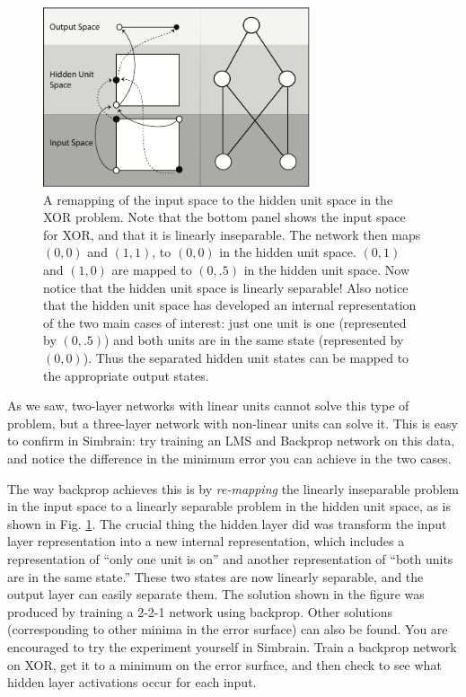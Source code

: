 \begin{figure}[h]
\centering
\includegraphics[width=0.7\textwidth]{images/xor_internal_rep.png}
\caption[Pamela Payne.]{A remapping of the input space to the hidden unit space in the XOR problem. Note that the bottom panel shows the input space for XOR, and that it is linearly inseparable. The network then maps $(0,0)$ and $(1,1)$,  to $(0,0)$ in the hidden unit space. $(0,1)$ and $(1,0)$ are mapped to $(0,.5)$ in the hidden unit space. Now notice that the hidden unit space is linearly separable!  Also notice that the hidden unit space has developed an internal representation of the two main cases of interest: just one unit is one (represented by $(0,.5)$) and both units are in the same state (represented by $(0,0)$). Thus the separated hidden unit states can be mapped to the appropriate output states.}
\label{xor_remapping}
\end{figure}

As we saw, two-layer networks with linear units cannot solve this type of problem, but a three-layer network with non-linear units can solve it. This is easy to confirm in Simbrain: try training an LMS and Backprop network on this data, and notice the difference in the minimum error you can achieve in the two cases. %

The way backprop achieves this is by \emph{re-mapping} the linearly inseparable problem in the input space to a linearly separable problem in the hidden unit space, as is shown in Fig. \ref{xor_remapping}. The crucial thing the hidden layer did was transform the input layer representation into a new internal representation, which includes a representation of ``only one unit is on'' and another representation of ``both units are in the same state.''  These two states are now linearly separable, and the output layer can easily separate them. The solution shown in the figure was produced by training a 2-2-1 network using backprop. Other solutions (corresponding to other minima in the error surface) can also be found. You are encouraged to try the experiment yourself in Simbrain. Train a backprop network on XOR, get it to a minimum on the error surface, and then check to see what hidden layer activations occur for each input.

